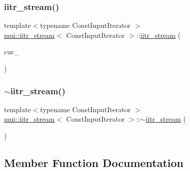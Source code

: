 \mbox{\label{classmui_1_1iitr__stream_a8989d81db9c1bf9736d7e00ca14dc80d}} 
\subsubsection{\texorpdfstring{iitr\+\_\+stream()}{iitr\_stream()}\hspace{0.1cm}{\footnotesize\ttfamily [2/2]}}
{\footnotesize\ttfamily template$<$typename Const\+Input\+Iterator $>$ \\
\hyperlink{classmui_1_1iitr__stream}{mui\+::iitr\+\_\+stream}$<$ Const\+Input\+Iterator $>$\+::\hyperlink{classmui_1_1iitr__stream}{iitr\+\_\+stream} (\begin{DoxyParamCaption}\item[{Const\+Input\+Iterator}]{cur\+\_\+ }\end{DoxyParamCaption})\hspace{0.3cm}{\ttfamily [inline]}}

\mbox{\label{classmui_1_1iitr__stream_a129cf88483da2a1fc727aae04cb317d9}} 
\subsubsection{\texorpdfstring{$\sim$iitr\+\_\+stream()}{~iitr\_stream()}}
{\footnotesize\ttfamily template$<$typename Const\+Input\+Iterator $>$ \\
\hyperlink{classmui_1_1iitr__stream}{mui\+::iitr\+\_\+stream}$<$ Const\+Input\+Iterator $>$\+::$\sim$\hyperlink{classmui_1_1iitr__stream}{iitr\+\_\+stream} (\begin{DoxyParamCaption}{ }\end{DoxyParamCaption})\hspace{0.3cm}{\ttfamily [inline]}}



\subsection{Member Function Documentation}
\mbox{\label{classmui_1_1iitr__stream_ab4f7f7a6e33eeb69b38d83b048dc9875}} 
